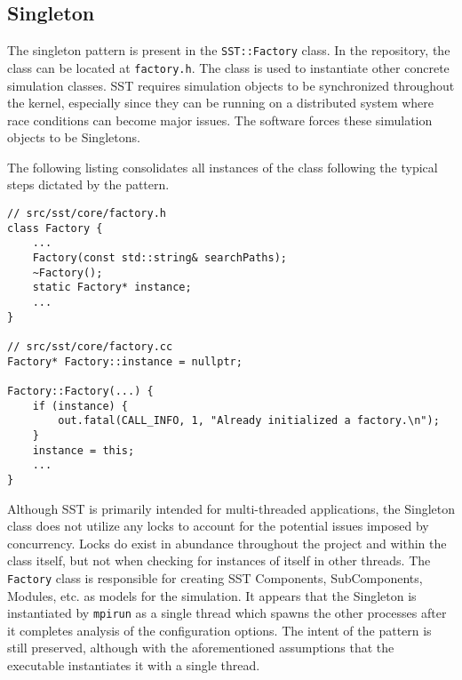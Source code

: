 
\subsection{Singleton}
The singleton pattern is present in the \texttt{SST::Factory} class. In the repository, the class can be located at \texttt{factory.h}. The class is used to instantiate other concrete simulation classes. SST requires simulation objects to be synchronized throughout the kernel, especially since they can be running on a distributed system where race conditions can become major issues. The software forces these simulation objects to be Singletons.

The following listing consolidates all instances of the class following the typical steps dictated by the pattern.

\begin{lstlisting}[style=customC++,label=singleton,caption=Factory Implementing the Singleton Pattern]
// src/sst/core/factory.h
class Factory {
    ...
    Factory(const std::string& searchPaths);
    ~Factory();
    static Factory* instance;
    ...
}

// src/sst/core/factory.cc
Factory* Factory::instance = nullptr;

Factory::Factory(...) {
    if (instance) {
        out.fatal(CALL_INFO, 1, "Already initialized a factory.\n");
    }
    instance = this;
    ...
}
\end{lstlisting}

Although SST is primarily intended for multi-threaded applications, the Singleton class does not utilize any locks to account for the potential issues imposed by concurrency. Locks do exist in abundance throughout the project and within the class itself, but not when checking for instances of itself in other threads. The \texttt{Factory} class is responsible for creating SST Components, SubComponents, Modules, etc. as models for the simulation. It appears that the Singleton is instantiated by \texttt{mpirun} as a single thread which spawns the other processes after it completes analysis of the configuration options. The intent of the pattern is still preserved, although with the aforementioned assumptions that the executable instantiates it with a single thread.

